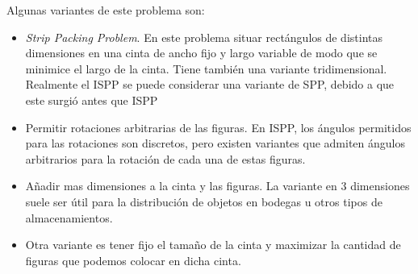Algunas variantes de este problema son:
\begin{itemize}
    \item \textit{Strip Packing Problem}. En este problema situar rectángulos de distintas dimensiones en una cinta de ancho fijo y largo variable de modo que se minimice el largo de la cinta. Tiene también una variante tridimensional. Realmente el ISPP se puede considerar una variante de SPP, debido a que este surgió antes que ISPP
    
    \item Permitir rotaciones arbitrarias de las figuras. En ISPP, los ángulos permitidos para las rotaciones son discretos, pero existen variantes que admiten ángulos arbitrarios para la rotación de cada una de estas figuras.
    
    \item Añadir mas dimensiones a la cinta y las figuras. La variante en 3 dimensiones suele ser útil para la distribución de objetos en bodegas u otros tipos de almacenamientos.

    \item Otra variante es tener fijo el tamaño de la cinta y maximizar la cantidad de figuras que podemos colocar en dicha cinta.

\end{itemize}
